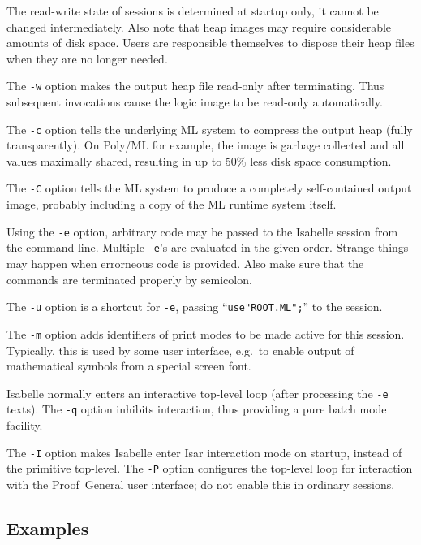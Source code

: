 The read-write state of sessions is determined at startup only, it cannot be
changed intermediately. Also note that heap images may require considerable
amounts of disk space. Users are responsible themselves to dispose their heap
files when they are no longer needed.

\medskip The \texttt{-w} option makes the output heap file read-only after
terminating.  Thus subsequent invocations cause the logic image to be
read-only automatically.

\medskip The \texttt{-c} option tells the underlying ML system to compress the
output heap (fully transparently).  On Poly/ML for example, the image is
garbage collected and all values maximally shared, resulting in up to 50\%
less disk space consumption.

\medskip The \texttt{-C} option tells the ML system to produce a completely
self-contained output image, probably including a copy of the ML runtime
system itself.

\medskip Using the \texttt{-e} option, arbitrary {\ML} code may be passed to
the Isabelle session from the command line. Multiple \texttt{-e}'s are
evaluated in the given order. Strange things may happen when errorneous {\ML}
code is provided. Also make sure that the {\ML} commands are terminated
properly by semicolon.

\medskip The \texttt{-u} option is a shortcut for \texttt{-e}, passing
``\texttt{use"ROOT.ML";}'' to the {\ML} session.

\medskip The \texttt{-m} option adds identifiers of print modes to be made
active for this session. Typically, this is used by some user interface, e.g.\ 
to enable output of mathematical symbols from a special screen font.

\medskip Isabelle normally enters an interactive top-level loop (after
processing the \texttt{-e} texts). The \texttt{-q} option inhibits
interaction, thus providing a pure batch mode facility.

\medskip The \texttt{-I} option makes Isabelle enter Isar interaction mode on
startup, instead of the primitive {\ML} top-level.  The \texttt{-P} option
configures the top-level loop for interaction with the Proof~General user
interface; do not enable this in ordinary sessions.


\subsection*{Examples}

